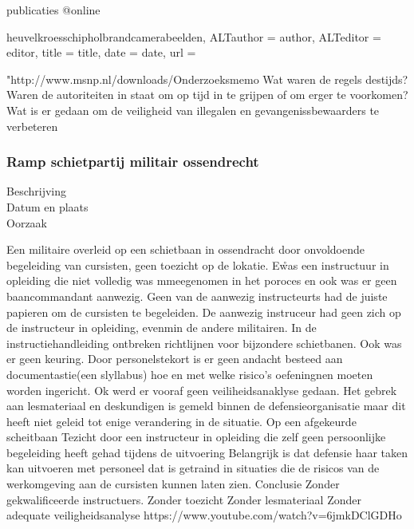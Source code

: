 {{{{publicaties
@online{heuvelkroesschipholbrandcamerabeelden,	ALTauthor = {author},	ALTeditor = {editor},	title = {title},	date = {date},	url = {"http://www.msnp.nl/downloads/Onderzoeksmemo%
Wat waren de regels destijds?
Waren de autoriteiten in staat om op tijd in te grijpen of om erger te voorkomen?
Wat is er gedaan om de veiligheid van illegalen en gevangenissbewaarders te verbeteren

\subsubsection{Ramp schietpartij militair ossendrecht }

\begin{description}
	\item[Beschrijving]
	\item[Datum en plaats] 
	\item[Oorzaak]
\end{description}
Een militaire overleid op een schietbaan in ossendracht door onvoldoende begeleiding van cursisten, geen toezicht op de lokatie. E\r was een instructuur in opleiding die niet volledig was mmeegenomen in het poroces en ook was er geen baancommandant aanwezig. Geen van de aanwezig instructeurts had de juiste papieren om de cursisten te begeleiden. De aanwezig instruceur had geen zich op de instructeur in opleiding, evenmin de andere militairen. In de instructiehandleiding ontbreken richtlijnen voor bijzondere schietbanen. Ook was er geen keuring. Door personelstekort is er geen andacht besteed aan documentastie(een slyllabus) hoe en met welke risico’s oefeningnen moeten worden ingericht. Ok werd er vooraf geen veiliheidsanaklyse gedaan. Het gebrek aan lesmateriaal en deskundigen is gemeld binnen de defensieorganisatie maar dit heeft niet geleid tot enige verandering in de situatie.
Op een afgekeurde scheitbaan
Tezicht door een instructeur in opleiding die zelf geen persoonlijke begeleiding heeft gehad tijdens de uitvoering
Belangrijk is dat defensie haar taken kan uitvoeren met personeel dat is getraind in situaties die de risicos van de werkomgeving aan de cursisten kunnen laten zien.
Conclusie
Zonder gekwalificeerde instructuers.
Zonder toezicht
Zonder lesmateriaal
Zonder adequate veiligheidsanalyse
https://www.youtube.com/watch?v=6jmkDClGDHo 
\cite{oVVSchietongevalOssendrecht}



}}}}}}
